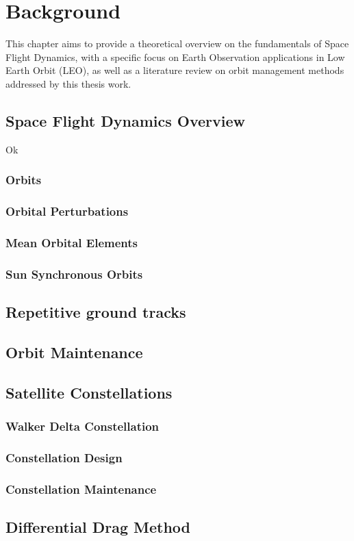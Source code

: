 \chapter{Background}

This chapter aims to provide a theoretical overview on the fundamentals of Space Flight Dynamics, with a specific focus on Earth Observation applications in Low Earth Orbit (LEO), as well as a literature review on orbit management methods addressed by this thesis work.

\section{Space Flight Dynamics Overview}

Ok \cite{anderson2023space}

\subsection{Orbits}
\subsection{Orbital Perturbations}
\subsection{Mean Orbital Elements}
\subsection{Sun Synchronous Orbits}



\section{Repetitive ground tracks}


\section{Orbit Maintenance}


\section{Satellite Constellations}
\subsection{Walker Delta Constellation}
\subsection{Constellation Design}
\subsection{Constellation Maintenance}


\section{Differential Drag Method}


